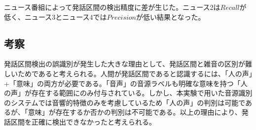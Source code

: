ニュース番組によって発話区間の検出精度に差が生じた。ニュース2は$Recall$が低く、ニュース3とニュース4では$Precision$が低い結果となった。

\subsection{考察}
発話区間検出の誤識別が発生した大きな理由として、発話区間と雑音の区別が難しいためであると考えられる。人間が発話区間であると認識するには、「人の声」+「意味」の両方が必要である。「音声」の音源ラベルも明確な意味を持つ「人の声」が存在する範囲にのみ付与されている。しかし、本実験で用いた音源識別のシステムでは音響的特徴のみを考慮しているため「人の声」の判別は可能であるが、「意味」が存在するか否かの判別は不可能である。以上の理由により、発話区間を正確に検出できなかったと考えられる。